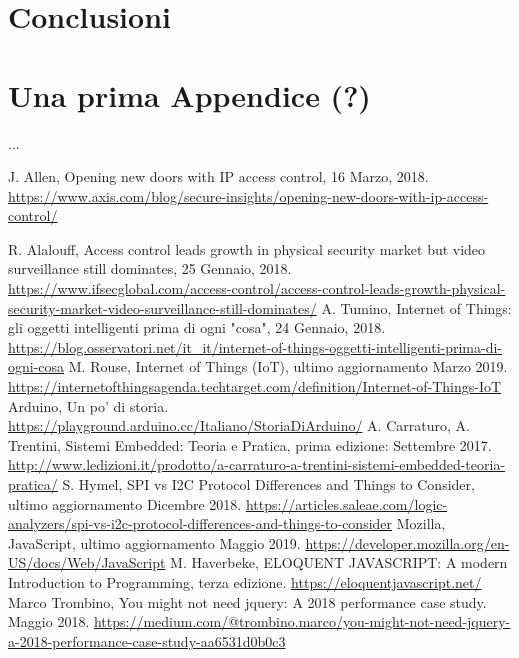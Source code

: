 \documentclass[12pt]{report}
\begin{document}
\chapter{Conclusioni}
\label{cap5}
%

\appendix
\chapter{Una prima Appendice (?)}
...


%
\begin{thebibliography}{00}
%
%	

J. Allen, Opening new doors with IP access control, 16 Marzo, 2018. \url{https://www.axis.com/blog/secure-insights/opening-new-doors-with-ip-access-control/}
%

R. Alalouff, Access control leads growth in physical security market but video surveillance still dominates, 25 Gennaio, 2018.
\url{https://www.ifsecglobal.com/access-control/access-control-leads-growth-physical-security-market-video-surveillance-still-dominates/}
%
A. Tumino, Internet of Things: gli oggetti intelligenti prima di ogni "cosa", 24 Gennaio, 2018.
\url{https://blog.osservatori.net/it_it/internet-of-things-oggetti-intelligenti-prima-di-ogni-cosa}
%
M. Rouse, Internet of Things (IoT), ultimo aggiornamento Marzo 2019.
\url{https://internetofthingsagenda.techtarget.com/definition/Internet-of-Things-IoT}
% 
Arduino, Un po' di storia.
\url{https://playground.arduino.cc/Italiano/StoriaDiArduino/}
%
A. Carraturo, A. Trentini, Sistemi Embedded: Teoria e Pratica, prima edizione: Settembre 2017.
\url{http://www.ledizioni.it/prodotto/a-carraturo-a-trentini-sistemi-embedded-teoria-pratica/}
%
S. Hymel, SPI vs I2C Protocol Differences and Things to Consider, ultimo aggiornamento Dicembre 2018.
\url{https://articles.saleae.com/logic-analyzers/spi-vs-i2c-protocol-differences-and-things-to-consider}
%
Mozilla, JavaScript, ultimo aggiornamento Maggio 2019.
\url{https://developer.mozilla.org/en-US/docs/Web/JavaScript}
%
M. Haverbeke, ELOQUENT JAVASCRIPT: A modern Introduction to Programming, terza edizione.
\url{https://eloquentjavascript.net/}
%
Marco Trombino, You might not need jquery: A 2018 performance
case study. Maggio 2018. 
\url{https://medium.com/@trombino.marco/you-might-not-need-jquery-a-2018-performance-case-study-aa6531d0b0c3}
\end{thebibliography}
%
\end{document}
